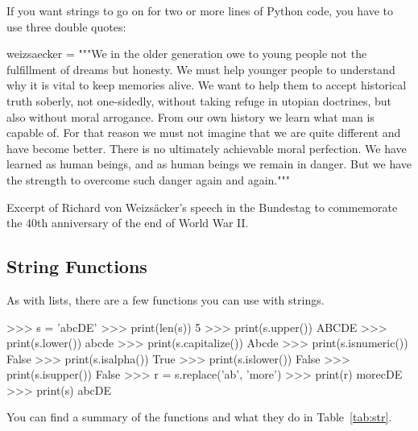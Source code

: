 \documentclass[11pt]{cselabheader}
\begin{document}
If you want strings to go on for two or more lines of Python code, you have to use three double
quotes:

\begin{listing}[H]
  \vspace{-0.5em}
\begin{python3code}
weizsaecker = """We in the older generation owe to young people not the 
fulfillment of dreams but honesty. We must help younger people to 
understand why it is vital to keep memories alive. We want to help them 
to accept historical truth soberly, not one-sidedly, without taking 
refuge in utopian doctrines, but also without moral arrogance. From our
own history we learn what man is capable of. For that reason we must not
imagine that we are quite different and have become better. There is no
ultimately achievable moral perfection. We have learned as human beings,
and as human beings we remain in danger. But we have the strength to 
overcome such danger again and again."""
\end{python3code}
  \vspace{-1em}
  \caption{Excerpt of Richard von Weizs\"{a}cker's speech in
the Bundestag to commemorate the 40th anniversary of the end of World War II.}
  \vspace{-0.5em}
\end{listing}

\subsection{String Functions}

As with lists, there are a few functions you can use with strings.

\begin{pyconcode}
>>> s = 'abcDE'
>>> print(len(s))
5
>>> print(s.upper())
ABCDE
>>> print(s.lower())
abcde
>>> print(s.capitalize())
Abcde
>>> print(s.isnumeric())
False
>>> print(s.isalpha())
True
>>> print(s.islower())
False
>>> print(s.isupper())
False
>>> r = s.replace('ab', 'more')
>>> print(r)
morecDE
>>> print(s)
abcDE
\end{pyconcode}

You can find a summary of the functions and what they do in Table~\ref{tab:str}.
\end{document}
